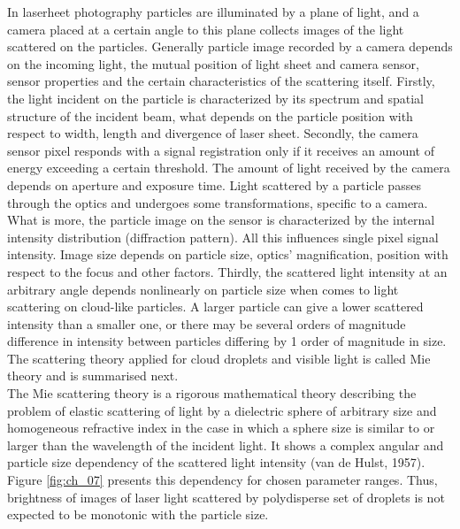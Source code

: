 \documentclass[../main.tex]{subfiles}
\begin{document}
In laserheet photography particles are illuminated by a plane of light, and a camera placed at a certain angle to this plane collects images of the light scattered on the particles. Generally particle image recorded by a camera depends on the incoming light, the mutual position of light sheet and camera sensor, sensor properties and the certain characteristics of the scattering itself. Firstly, the light incident on the particle is characterized by its spectrum and spatial structure of the incident beam, what depends on the particle position with respect to width, length and divergence of laser sheet. Secondly, the camera sensor pixel responds with a signal registration only if it receives an amount of energy exceeding a certain threshold. The amount of light received by the camera depends on aperture and exposure time. Light scattered by a particle passes through the optics and undergoes some transformations, specific to a camera. What is more, the particle image on the sensor is characterized by the internal intensity distribution (diffraction pattern). All this influences single pixel signal intensity. Image size depends on particle size, optics’ magnification, position with respect to the focus and other factors\citep{Olsen2000}. Thirdly, the scattered light intensity at an arbitrary angle depends nonlinearly on particle size when comes to light scattering on cloud-like particles. A larger particle can give a lower scattered intensity than a smaller one, or there may be several orders of magnitude difference in intensity between particles differing by 1 order of magnitude in size. The scattering theory applied for cloud droplets and visible light is called Mie theory and is summarised next.\\
The Mie scattering theory is a rigorous mathematical theory describing the problem of elastic scattering of light by a dielectric sphere of arbitrary size and homogeneous refractive index in the case in which a sphere size is similar to or larger than the wavelength of the incident light. It shows a complex angular and particle size dependency of the scattered light intensity (van de Hulst, 1957). Figure \ref{fig:ch_07} presents this dependency for chosen parameter ranges. Thus, brightness of images of laser light scattered by polydisperse set of droplets is not expected to be monotonic with the particle size.
\end{document}
